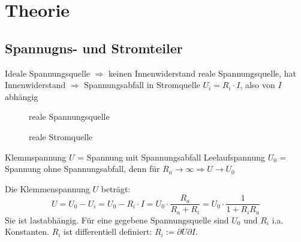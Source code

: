 \section{Theorie}

\subsection{Spannugns- und Stromteiler}
Ideale Spannungsquelle $\Rightarrow$ keinen Innenwiderstand reale Spannungsquelle, hat Innenwiderstand $\Rightarrow$ Spannungsabfall in Stromquelle $U_{i} = R_{i} \cdot I$, also von $I$ abhängig

\begin{figure}[!ht]
    \centering
    \begin{minipage}[b]{0.45\textwidth}
        \centering
        
        \caption{reale Spannungsquelle}
        \label{fig:image1}
    \end{minipage}
    \hspace{0.05\textwidth} %
    \begin{minipage}[b]{0.45\textwidth}
        \centering
        
        \caption{reale Stromquelle}
        \label{fig:image2}
    \end{minipage}
\end{figure}

Klemmspannung $U$ = Spannung mit Spannungsabfall
Leelaufspannung $U_{0}$ = Spannung ohne Spannungsabfall, denn für $R_{a} \to \infty \Rightarrow U \to U_{0}$ 

Die Klemmenspannung $U$ beträgt:
\begin{equation}
U = U_{0} - U_{i} = U_{0} - R_{i} \cdot I = U_{0} \cdot \frac{R_{a}}{R_{a} + R_{i}} = U_{0} \cdot \frac{1}{1 + R_i R_a}
\tag{232.1}
\end{equation}
Sie ist lastabhängig. 
Für eine gegebene Spannungsquelle sind $U_{0}$ und $R_{i}$ i.a. Konstanten. $R_{i}$ ist differentiell definiert: $R_{i} := \partial U \partial I$. 




